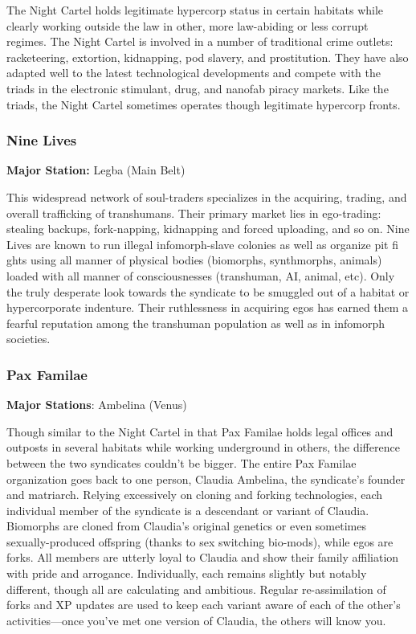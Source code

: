 The Night Cartel holds legitimate hypercorp status in certain habitats
while clearly working outside the law in other, more law-abiding or
less corrupt regimes. The Night Cartel is involved in a number of
traditional crime outlets: racketeering, extortion, kidnapping, pod
slavery, and prostitution. They have also adapted well to the latest
technological developments and compete with the triads in the
electronic stimulant, drug, and nanofab piracy markets. Like the
triads, the Night Cartel sometimes operates though legitimate
hypercorp fronts.

\subsubsection{Nine Lives}
\label{sec:nine-lives}

\textbf{Major Station:} Legba (Main Belt)

This widespread network of soul-traders specializes in the acquiring,
trading, and overall trafficking of transhumans. Their primary market
lies in ego-trading: stealing backups, fork-napping, kidnapping and
forced uploading, and so on. Nine Lives are known to run illegal
infomorph-slave colonies as well as organize pit fi ghts using all
manner of physical bodies (biomorphs, synthmorphs, animals) loaded
with all manner of consciousnesses (transhuman, AI, animal, etc). Only
the truly desperate look towards the syndicate to be smuggled out of a
habitat or hypercorporate indenture. Their ruthlessness in acquiring
egos has earned them a fearful reputation among the transhuman
population as well as in infomorph societies.

\subsubsection{Pax Familae}
\label{sec:pax-familae}

\textbf{Major Stations}: Ambelina (Venus)

Though similar to the Night Cartel in that Pax Familae holds legal
offices and outposts in several habitats while working underground in
others, the difference between the two syndicates couldn't be
bigger. The entire Pax Familae organization goes back to one person,
Claudia Ambelina, the syndicate's founder and matriarch.  Relying
excessively on cloning and forking technologies, each individual
member of the syndicate is a descendant or variant of
Claudia. Biomorphs are cloned from Claudia's original genetics or even
sometimes sexually-produced offspring (thanks to sex switching
bio-mods), while egos are forks. All members are utterly loyal to
Claudia and show their family affiliation with pride and
arrogance. Individually, each remains slightly but notably different,
though all are calculating and ambitious. Regular re-assimilation of
forks and XP updates are used to keep each variant aware of each of
the other's activities—once you've met one version of Claudia, the
others will know you.

